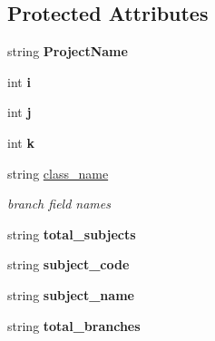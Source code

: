 \subsection*{Protected Attributes}
\begin{DoxyCompactItemize}
\item 
\hypertarget{classHTMLTags_a9ed88cd64186174fe5453bc59b3fbe46}{string {\bfseries Project\-Name}}\label{classHTMLTags_a9ed88cd64186174fe5453bc59b3fbe46}

\item 
\hypertarget{classHTMLTags_a571b1d2b580555251d0f131086a57677}{int {\bfseries i}}\label{classHTMLTags_a571b1d2b580555251d0f131086a57677}

\item 
\hypertarget{classHTMLTags_a9af17bf120e2c2e3dc8ec7c2ecfb8d90}{int {\bfseries j}}\label{classHTMLTags_a9af17bf120e2c2e3dc8ec7c2ecfb8d90}

\item 
\hypertarget{classHTMLTags_a23b5212cbe6e637c5a15b2ddf0144884}{int {\bfseries k}}\label{classHTMLTags_a23b5212cbe6e637c5a15b2ddf0144884}

\item 
\hypertarget{classHTMLTags_a0f9836866fc87432dc643c8eff043b1e}{string \hyperlink{classHTMLTags_a0f9836866fc87432dc643c8eff043b1e}{class\-\_\-name}}\label{classHTMLTags_a0f9836866fc87432dc643c8eff043b1e}

\begin{DoxyCompactList}\small\item\em branch field names \end{DoxyCompactList}\item 
\hypertarget{classHTMLTags_a150314c7c15f317e6600129991d342bb}{string {\bfseries total\-\_\-subjects}}\label{classHTMLTags_a150314c7c15f317e6600129991d342bb}

\item 
\hypertarget{classHTMLTags_acda47c333a94c60172aec7023715e562}{string {\bfseries subject\-\_\-code}}\label{classHTMLTags_acda47c333a94c60172aec7023715e562}

\item 
\hypertarget{classHTMLTags_a2ae76cfc823201fd1043c8939f3c15ab}{string {\bfseries subject\-\_\-name}}\label{classHTMLTags_a2ae76cfc823201fd1043c8939f3c15ab}

\item 
\hypertarget{classHTMLTags_a1987b2f2a9c4bc84fbfc8b1fdf031016}{string {\bfseries total\-\_\-branches}}\label{classHTMLTags_a1987b2f2a9c4bc84fbfc8b1fdf031016}


\end{DoxyCompactItemize}
